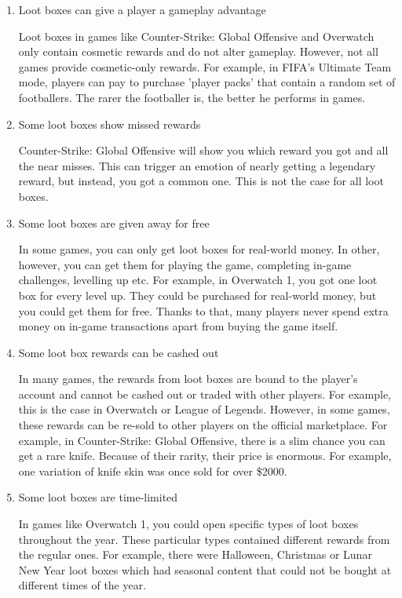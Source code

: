 \documentclass[10pt,oneside,english,a4paper]{article}
\begin{document}
\begin{enumerate}

\item Loot boxes can give a player a gameplay advantage

	Loot boxes in games like Counter-Strike: Global Offensive and Overwatch only contain cosmetic rewards and do not alter gameplay. However, not all games provide cosmetic-only rewards. For example, in FIFA's Ultimate Team mode, players can pay to purchase 'player packs' that contain a random set of footballers. The rarer the footballer is, the better he performs in games.\cite{fifa:lootboxes}

\item Some loot boxes show missed rewards
	
	Counter-Strike: Global Offensive will show you which reward you got and all the near misses. This can trigger an emotion of nearly getting a legendary reward, but instead, you got a common one. This is not the case for all loot boxes.

\item Some loot boxes are given away for free

	In some games, you can only get loot boxes for real-world money. In other, however, you can get them for playing the game, completing in-game challenges, levelling up etc. For example, in Overwatch 1, you got one loot box for every level up. They could be purchased for real-world money, but you could get them for free. Thanks to that, many players never spend extra money on in-game transactions apart from buying the game itself.

\item Some loot box rewards can be cashed out

	In many games, the rewards from loot boxes are bound to the player's account and cannot be cashed out or traded with other players. For example, this is the case in Overwatch or League of Legends. However, in some games, these rewards can be re-sold to other players on the official marketplace. For example, in Counter-Strike: Global Offensive, there is a slim chance you can get a rare knife. Because of their rarity, their price is enormous. For example, one variation of knife skin was once sold for over \$2000. \cite{csgo:knives}

\item Some loot boxes are time-limited
	
	In games like Overwatch 1, you could open specific types of loot boxes throughout the year. These particular types contained different rewards from the regular ones. For example, there were Halloween, Christmas or Lunar New Year loot boxes which had seasonal content that could not be bought at different times of the year.

\end{enumerate}
\end{document}
